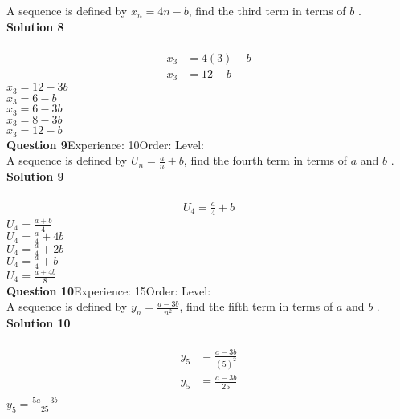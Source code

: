 \documentclass{article}
\begin{document}
A sequence is defined by $x_n=4n-b$, find the third term in terms of $b$ .\\[4pt]
\noindent\textbf{Solution 8}\\[2pt]
\\[-10pt]\begin{align*}
x_3&=4(3)-b\\
x_3&=12-b
\end{align*}
$x_3=12-3b$\\
$x_3=6-b$\\
$x_3=6-3b$\\
$x_3=8-3b$\\
$x_3=12-b$\\
\noindent\textbf{Question 9}\hspace{20pt}Experience: 10\hspace{20pt}Order: \hspace{20pt}Level: \\[2pt]
A sequence is defined by $U_n=\displaystyle\frac{a}{n}+b$, find the fourth term in terms of $a$ and $b$ .\\[4pt]
\noindent\textbf{Solution 9}\\[2pt]
\\[-10pt]\begin{align*}
U_4=\displaystyle\frac{a}{4}+b
\end{align*}
$U_4=\displaystyle\frac{a+b}{4}$\\
$U_4=\displaystyle\frac{a}{4}+4b$\\
$U_4=\displaystyle\frac{a}{4}+2b$\\
$U_4=\displaystyle\frac{a}{4}+b$\\
$U_4=\displaystyle\frac{a+4b}{8}$\\
\noindent\textbf{Question 10}\hspace{20pt}Experience: 15\hspace{20pt}Order: \hspace{20pt}Level: \\[2pt]
A sequence is defined by $y_n=\displaystyle\frac{a-3b}{n^2}$, find the fifth term in terms of $a$ and $b$ .\\[4pt]
\noindent\textbf{Solution 10}\\[2pt]
\\[-10pt]\begin{align*}
y_5&=\displaystyle\frac{a-3b}{(5)^2}\\[2pt]
y_5&=\displaystyle\frac{a-3b}{25}\\[2pt]
\end{align*}
$y_5=\displaystyle\frac{5a-3b}{25}$\\
\end{document}
